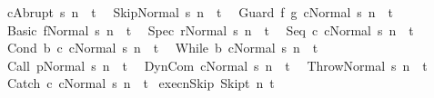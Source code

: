 \begin{isabellebody}
\ \ {\isachardoublequoteopen}{\isasymGamma}{\isasymturnstile}{\isasymlangle}c{\isacharcomma}Abrupt\ s{\isasymrangle}\ {\isacharequal}n{\isasymRightarrow}\ \ t{\isachardoublequoteclose}\isanewline
\ \ {\isachardoublequoteopen}{\isasymGamma}{\isasymturnstile}{\isasymlangle}Skip{\isacharcomma}Normal\ s{\isasymrangle}\ {\isacharequal}n{\isasymRightarrow}\ \ t{\isachardoublequoteclose}\isanewline
\ \ {\isachardoublequoteopen}{\isasymGamma}{\isasymturnstile}{\isasymlangle}Guard\ f\ g\ c{\isacharcomma}Normal\ s{\isasymrangle}\ {\isacharequal}n{\isasymRightarrow}\ \ t{\isachardoublequoteclose}\isanewline
\ \ {\isachardoublequoteopen}{\isasymGamma}{\isasymturnstile}{\isasymlangle}Basic\ f{\isacharcomma}Normal\ s{\isasymrangle}\ {\isacharequal}n{\isasymRightarrow}\ \ t{\isachardoublequoteclose}\isanewline
\ \ {\isachardoublequoteopen}{\isasymGamma}{\isasymturnstile}{\isasymlangle}Spec\ r{\isacharcomma}Normal\ s{\isasymrangle}\ {\isacharequal}n{\isasymRightarrow}\ \ t{\isachardoublequoteclose}\isanewline
\ \ {\isachardoublequoteopen}{\isasymGamma}{\isasymturnstile}{\isasymlangle}Seq\ c{}\ c{}{\isacharcomma}Normal\ s{\isasymrangle}\ {\isacharequal}n{\isasymRightarrow}\ \ t{\isachardoublequoteclose}\isanewline
\ \ {\isachardoublequoteopen}{\isasymGamma}{\isasymturnstile}{\isasymlangle}Cond\ b\ c{}\ c{}{\isacharcomma}Normal\ s{\isasymrangle}\ {\isacharequal}n{\isasymRightarrow}\ \ t{\isachardoublequoteclose}\isanewline
\ \ {\isachardoublequoteopen}{\isasymGamma}{\isasymturnstile}{\isasymlangle}While\ b\ c{\isacharcomma}Normal\ s{\isasymrangle}\ {\isacharequal}n{\isasymRightarrow}\ \ t{\isachardoublequoteclose}\isanewline
\ \ {\isachardoublequoteopen}{\isasymGamma}{\isasymturnstile}{\isasymlangle}Call\ p{\isacharcomma}Normal\ s{\isasymrangle}\ {\isacharequal}n{\isasymRightarrow}\ \ t{\isachardoublequoteclose}\isanewline
\ \ {\isachardoublequoteopen}{\isasymGamma}{\isasymturnstile}{\isasymlangle}DynCom\ c{\isacharcomma}Normal\ s{\isasymrangle}\ {\isacharequal}n{\isasymRightarrow}\ \ t{\isachardoublequoteclose}\isanewline
\ \ {\isachardoublequoteopen}{\isasymGamma}{\isasymturnstile}{\isasymlangle}Throw{\isacharcomma}Normal\ s{\isasymrangle}\ {\isacharequal}n{\isasymRightarrow}\ \ t{\isachardoublequoteclose}\isanewline
\ \ {\isachardoublequoteopen}{\isasymGamma}{\isasymturnstile}{\isasymlangle}Catch\ c{}\ c{}{\isacharcomma}Normal\ s{\isasymrangle}\ {\isacharequal}n{\isasymRightarrow}\ \ t{\isachardoublequoteclose}\isanewline
\isanewline
{}\isamarkupfalse%
\ execn{\isacharunderscore}Skip{\isacharprime}{\isacharcolon}\ {\isachardoublequoteopen}{\isasymGamma}{\isasymturnstile}{\isasymlangle}Skip{\isacharcomma}t{\isasymrangle}\ {\isacharequal}n{\isasymRightarrow}\ t{\isachardoublequoteclose}\isanewline

\end{isabellebody}
